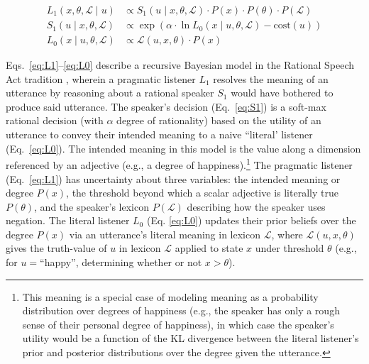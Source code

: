 \documentclass[floatsintext,doc]{apa6}
\let\rmarkdownfootnote\footnote%
\def\footnote{\protect\rmarkdownfootnote}
\begin{document}
\vspace*{-0.5cm}

\begin{align}
L_{1}(x, \theta, \mathcal{L} \mid u) &\propto S_{1}(u \mid x, \theta, \mathcal{L}) \cdot P(x) \cdot  P(\theta) \cdot P(\mathcal{L}) \label{eq:L1} \\
S_{1}(u \mid x, \theta, \mathcal{L}) &\propto \exp{(\alpha \cdot \ln {L_{0}(x \mid u, \theta, \mathcal{L})} - \text{cost}(u))} \label{eq:S1}\\
L_{0}(x \mid u, \theta, \mathcal{L}) &\propto \mathcal{L}(u, x, \theta) \cdot P(x) \label{eq:L0}
\end{align}

Eqs.~\ref{eq:L1}--\ref{eq:L0} describe a recursive Bayesian model in the Rational Speech Act tradition \cite{Franke2015a, Goodman2016:RSA}, wherein a pragmatic listener $L_1$ resolves the meaning of an utterance by reasoning about a rational speaker $S_1$ would have bothered to produce said utterance.
The speaker's decision (Eq.~\ref{eq:S1}) is a soft-max rational decision (with $\alpha$ degree of rationality) based on the utility of an utterance to convey their intended meaning to a naive ``literal' listener (Eq.~\ref{eq:L0}). 
The intended meaning in this model is the value along a dimension referenced by an adjective (e.g., a degree of happiness).\footnote{
	This meaning is a special case of modeling meaning as a probability distribution over degrees of happiness (e.g., the speaker has only a rough sense of their personal degree of happiness), in which case the speaker's utility would be a function of the KL divergence between the literal listener's prior and posterior distributions over the degree given the utterance. 
}
The pragmatic listener (Eq.~\ref{eq:L1}) has uncertainty about three variables: the intended meaning or degree $P(x)$, the threshold beyond which a scalar adjective is literally true  $P(\theta)$, and the speaker's lexicon \(P(\mathcal{L})\) describing how the speaker uses negation. 
The literal listener \(L_0\) (Eq. \ref{eq:L0}) updates their prior beliefs over the degree \(P(x)\) via an utterance's literal meaning in lexicon \(\mathcal{L}\),
where \(\mathcal{L}(u, x, \theta)\) gives the truth-value of \(u\) in lexicon \(\mathcal{L}\) applied to state \(x\) under threshold \(\theta\) (e.g., for $u= $\enquote{happy}, determining whether or not \(x>\theta\)).
\end{document}
